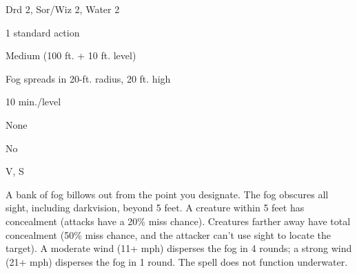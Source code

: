 
\begin{description*}
\item[Level:] Drd 2, Sor/Wiz 2, Water 2
\item[Casting Time:] 1 standard action
\item[Range:] Medium (100 ft. + 10 ft. level)
\item[Effect:] Fog spreads in 20-ft. radius, 20 ft. high
\item[Duration:] 10 min./level
\item[Saving Throw:] None
\item[Spell Resistance:] No
\item[Components:] V, S
\end{description*}

A bank of fog billows out from the point you designate. The fog obscures all sight,
including darkvision, beyond 5 feet. A creature within 5 feet has concealment (attacks
have a 20\% miss chance). Creatures farther away have total concealment (50\% miss
chance, and the attacker can't use sight to locate the target).
A moderate wind (11+ mph) disperses the fog in 4 rounds; a strong wind (21+ mph)
disperses the fog in 1 round.
The spell does not function underwater.